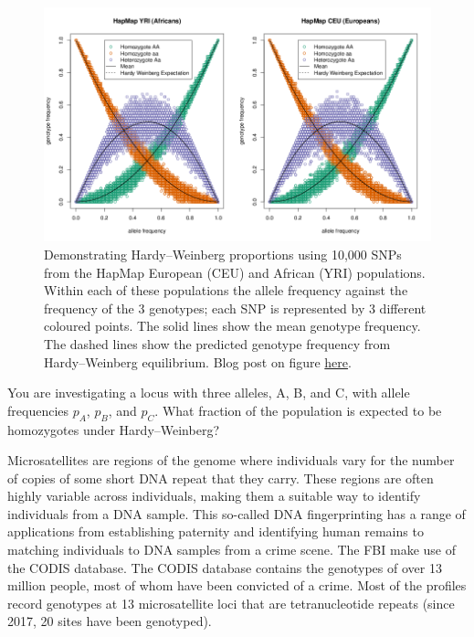 {{\begin{figure}[!h]
\begin{center}
\includegraphics[width= \textwidth]{figures/CEU_YRI_separately_HWE.png}
\end{center}
\caption{Demonstrating Hardy--Weinberg proportions using 10,000 SNPs
  from the HapMap European (CEU)  and African (YRI) populations. Within
  each of these populations the allele frequency against the
  frequency of the 3 genotypes; each SNP is represented by 3 different
  coloured points. The solid lines show the mean genotype frequency. The dashed lines show the
  predicted genotype frequency from Hardy--Weinberg
  equilibrium.  Blog
  post on figure \href{http://gcbias.org/2011/10/13/population-genetics-course-resources-Hardy--Weinberg-eq/}{here}. } \label{fig:HWE_CEU_YRI}  %
\end{figure}

\begin{question}
You are investigating a locus with three alleles, A, B, and C, with
allele frequencies $p_A$, $p_B$, and $p_C$. What fraction of the
population is expected to be homozygotes under Hardy--Weinberg?
\end{question}

Microsatellites are regions of the genome where individuals vary for
the number of copies of some short DNA repeat that they carry. These
regions are often highly variable across individuals, making them
a suitable way to identify individuals from a DNA sample. This
so-called DNA fingerprinting has a range of applications from
establishing paternity and identifying human remains to matching
individuals to DNA samples from a crime scene. The FBI make use of the
CODIS database. The CODIS
database contains the genotypes of over 13 million people, most of
whom have been convicted of a crime. Most of
the profiles record genotypes at 13 microsatellite loci that are
tetranucleotide repeats (since 2017, 20 sites have been genotyped).

}}

